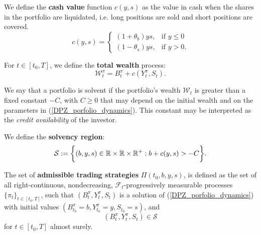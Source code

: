 \begin{Definition}
We define the \textbf{cash value} function $c(y,s)$ as the value in cash when the shares in the portfolio are liquidated, i.e.  
long positions are sold and short positions are covered.
\begin{equation}\label{cost_function}
c(y,s) = \begin{cases} 
(1+\theta_b)ys, & \mbox{if } y\leq 0 \\ 
(1-\theta_s)ys, & \mbox{if } y>0 . 
\end{cases} 
\end{equation} 
\end{Definition}
\begin{Definition}
For $t\in [t_0,T]$, we define the \textbf{total wealth} process:
\begin{equation}\label{wealth_process}
 \mathcal{W}^{\pi}_t = B^{\pi}_t + c(Y^{\pi}_t,S_t).
\end{equation} 
\end{Definition}
We say that a portfolio is solvent if the portfolio's wealth $\mathcal{W}_t$ is greater than a fixed constant $-C$, with 
$C\geq0$ that may depend on the initial wealth and on the parameters in (\ref{DPZ_porfolio_dynamics}). 
This constant may be interpreted as the \emph{credit availability} of the investor.
\begin{Definition}
We define the \textbf{solvency region}:
\begin{equation}\label{solvency_region}
 \mathcal{S} := \biggl\{ (b,y,s) \in \mathbb{R} \times \mathbb{R} \times \mathbb{R}^+ : b + c(y,s) > -C  \biggr\}.
\end{equation} 
\end{Definition}
\begin{Definition}\label{admissible_strategies1}
The set of \textbf{admissible trading strategies} $\Pi(t_0,b,y,s)$, is defined   
as the set of all right-continuous, nondecreasing, $\mathcal{F}_t$-progressively measurable processes  
$\{\pi_t\}_{t \in [t_0,T]}$, such that $(B^\pi_t,Y^\pi_t,S_t)$ is a solution of (\ref{DPZ_porfolio_dynamics}) with initial values $(B^\pi_{t_0} = b, Y^\pi_{t_0} = y, S_{t_0} = s)$, 
and 
\begin{equation}
 (B^\pi_t,Y^\pi_t,S_t) \in \mathcal{S}
\end{equation}
for $t \in [t_0,T]$ almost surely.
\end{Definition}




